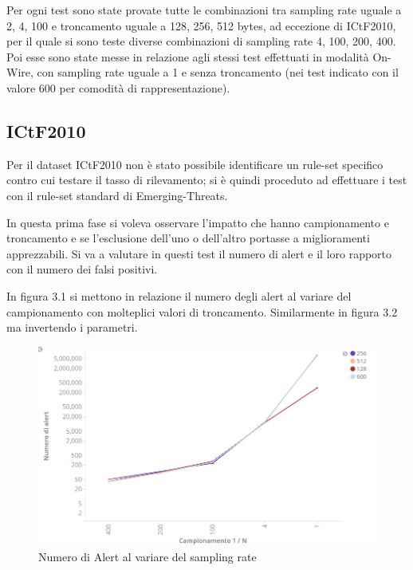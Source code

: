 \documentclass[12pt,a4paper,openright,twoside]{report}
\begin{document}
Per ogni test sono state provate tutte le combinazioni tra sampling rate uguale a
2, 4, 100 e troncamento uguale a 128, 256, 512 bytes, ad eccezione di ICtF2010,
per il quale si sono teste diverse combinazioni di sampling rate 4, 100, 200, 400.
Poi esse sono state messe in relazione agli stessi test effettuati in modalit\`a On-Wire,
con sampling rate uguale a 1 e senza troncamento (nei test indicato con il valore 600 per comodit\`a di rappresentazione).
\subsection{ICtF2010}

Per il dataset ICtF2010 non \`e stato possibile identificare un rule-set specifico
contro cui testare il tasso di rilevamento; si \`e quindi proceduto ad effettuare i
test con il rule-set standard di Emerging-Threats.

In questa prima fase si voleva osservare l'impatto che hanno campionamento e troncamento
e se l'esclusione dell'uno o dell'altro portasse a miglioramenti apprezzabili.
Si va a valutare in questi test il numero di alert e il loro rapporto con il numero dei
falsi positivi.

In figura 3.1 si mettono in relazione il numero degli alert al variare del campionamento
con molteplici valori di troncamento. Similarmente in figura 3.2 ma invertendo i
parametri.


\begin{figure}[h!]
\begin{center}                          %
  \includegraphics[width=\textwidth]{images/ICTF-samp-vs-trunc.png}
  \caption{Numero di Alert al variare del sampling rate}
  \label{}
\end{center}
\end{figure}
\end{document}
